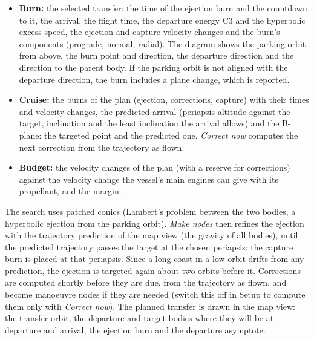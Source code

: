 \documentclass[Orbiter User Manual.tex]{subfiles}
\begin{document}
\begin{itemize}
\item \textbf{Burn:} the selected transfer: the time of the ejection burn and the countdown to it, the arrival, the flight time, the departure energy C3 and the hyperbolic excess speed, the ejection and capture velocity changes and the burn's components (prograde, normal, radial). The diagram shows the parking orbit from above, the burn point and direction, the departure direction and the direction to the parent body. If the parking orbit is not aligned with the departure direction, the burn includes a plane change, which is reported.
\item \textbf{Cruise:} the burns of the plan (ejection, corrections, capture) with their times and velocity changes, the predicted arrival (periapsis altitude against the target, inclination and the least inclination the arrival allows) and the B-plane: the targeted point and the predicted one. \textit{Correct now} computes the next correction from the trajectory as flown.
\item \textbf{Budget:} the velocity changes of the plan (with a reserve for corrections) against the velocity change the vessel's main engines can give with its propellant, and the margin.
\end{itemize}

\noindent
The search uses patched conics (Lambert's problem between the two bodies, a hyperbolic ejection from the parking orbit). \textit{Make nodes} then refines the ejection with the trajectory prediction of the map view (the gravity of all bodies), until the predicted trajectory passes the target at the chosen periapsis; the capture burn is placed at that periapsis. Since a long coast in a low orbit drifts from any prediction, the ejection is targeted again about two orbits before it. Corrections are computed shortly before they are due, from the trajectory as flown, and become manoeuvre nodes if they are needed (switch this off in Setup to compute them only with \textit{Correct now}). The planned transfer is drawn in the map view: the transfer orbit, the departure and target bodies where they will be at departure and arrival, the ejection burn and the departure asymptote.
\end{document}
